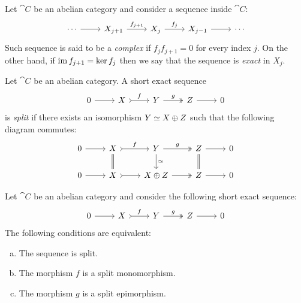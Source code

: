 \begin{definition}
    \label{def:abelian-cat-complex-exact-sequence}
    Let \(\cat C\) be an abelian category and consider a sequence inside \(\cat C\):
    \[
        \begin{tikzcd}
            \cdots \ar[r]
            &X_{j+1} \ar[r, "f_{j+1}"]
            &X_j \ar[r, "f_j"]
            &X_{j-1} \ar[r]
            &\cdots
        \end{tikzcd}
    \]
    Such sequence is said to be a \emph{complex} if \(f_j f_{j+1} = 0\) for every
    index \(j\). On the other hand, if \(\operatorname{im} f_{j+1} = \ker f_j\) then we say that
    the sequence is \emph{exact} in \(X_j\).
\end{definition}

\begin{definition}
    \label{def:abelian-cat-split-short-exact}
    Let \(\cat C\) be an abelian category. A short exact sequence
    \[
        \begin{tikzcd}
            0 \ar[r] &X \ar[r, "f", tail] &Y \ar[r, two heads, "g"] &Z \ar[r] &0
        \end{tikzcd}
    \]
    is \emph{split} if there exists an isomorphism \(Y \simeq X \oplus Z\) such that the
    following diagram commutes:
    \[
        \begin{tikzcd}
            0 \ar[r]
            &X \ar[r, "f", tail] \ar[d, equals]
            &Y \ar[r, two heads, "g"] \ar[d, "\dis"]
            &Z \ar[r] \ar[d, equals]
            &0
            \\
            0 \ar[r]
            &X \ar[r, tail]
            &X \oplus Z \ar[r, two heads]
            &Z \ar[r]
            &0
        \end{tikzcd}
    \]
\end{definition}

\begin{theorem}
    \label{thm:abelian-cat-split-equivalent-conditions}
    Let \(\cat C\) be an abelian category and consider the following short exact
    sequence:
    \[
        \begin{tikzcd}
            0 \ar[r] &X \ar[r, "f", tail] &Y \ar[r, two heads, "g"] &Z \ar[r] &0
        \end{tikzcd}
    \]
    The following conditions are equivalent:
    \begin{enumerate}[(a)]\setlength\itemsep{0em}
        \item The sequence is split.

        \item The morphism \(f\) is a split monomorphism.

        \item The morphism \(g\) is a split epimorphism.
    \end{enumerate}
\end{theorem}

